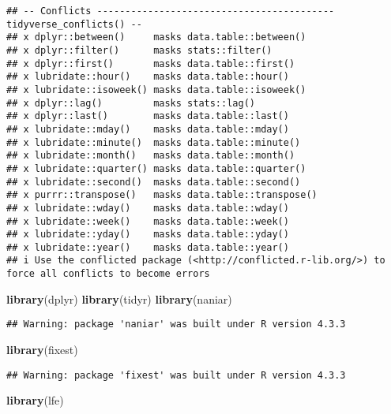 \documentclass[
]{article}
\newenvironment{Shaded}{\begin{snugshade}}{\end{snugshade}}
\newcommand{\FunctionTok}[1]{\textcolor[rgb]{0.13,0.29,0.53}{\textbf{#1}}}
\newcommand{\NormalTok}[1]{#1}
\begin{document}
\begin{verbatim}
## -- Conflicts ------------------------------------------ tidyverse_conflicts() --
## x dplyr::between()     masks data.table::between()
## x dplyr::filter()      masks stats::filter()
## x dplyr::first()       masks data.table::first()
## x lubridate::hour()    masks data.table::hour()
## x lubridate::isoweek() masks data.table::isoweek()
## x dplyr::lag()         masks stats::lag()
## x dplyr::last()        masks data.table::last()
## x lubridate::mday()    masks data.table::mday()
## x lubridate::minute()  masks data.table::minute()
## x lubridate::month()   masks data.table::month()
## x lubridate::quarter() masks data.table::quarter()
## x lubridate::second()  masks data.table::second()
## x purrr::transpose()   masks data.table::transpose()
## x lubridate::wday()    masks data.table::wday()
## x lubridate::week()    masks data.table::week()
## x lubridate::yday()    masks data.table::yday()
## x lubridate::year()    masks data.table::year()
## i Use the conflicted package (<http://conflicted.r-lib.org/>) to force all conflicts to become errors
\end{verbatim}

\begin{Shaded}
\begin{Highlighting}[]
\FunctionTok{library}\NormalTok{(dplyr)}
\FunctionTok{library}\NormalTok{(tidyr)}
\FunctionTok{library}\NormalTok{(naniar)}
\end{Highlighting}
\end{Shaded}

\begin{verbatim}
## Warning: package 'naniar' was built under R version 4.3.3
\end{verbatim}

\begin{Shaded}
\begin{Highlighting}[]
\FunctionTok{library}\NormalTok{(fixest)}
\end{Highlighting}
\end{Shaded}

\begin{verbatim}
## Warning: package 'fixest' was built under R version 4.3.3
\end{verbatim}

\begin{Shaded}
\begin{Highlighting}[]
\FunctionTok{library}\NormalTok{(lfe)}
\end{Highlighting}
\end{Shaded}
\end{document}
